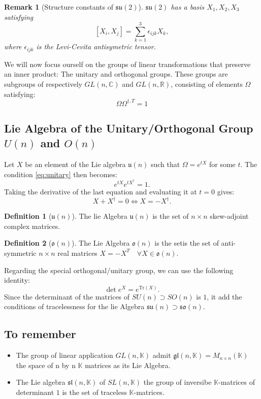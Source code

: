 \documentclass[11pt,a4paper]{article}
\newtheorem*{remark}{Remark}
\theoremstyle{definition}
\newtheorem{definition}{Definition}[section]
\numberwithin{equation}{section}
\begin{document}
\begin{remark}[Structure constants of $\mathfrak{su}(2)$]
    $\mathfrak{su}(2)$ has a basis $X_1,X_2,X_3$ satisfying
    \begin{equation*}
        \left[X_i,X_j\right] = \sum_{k=1}^{3}\epsilon_{ijk}X_k,
    \end{equation*}
    where $\epsilon_{ijk}$ is the Levi-Cevita antisymetric tensor.
\end{remark}
We will now focus ourself on the groups of linear transformations that preserve an inner product: The unitary and orthogonal groups. These groups are subgroups of respectively $GL(n,\mathbb{C})$ and $GL(n,\mathbb{R})$, consisting of elements $\Omega$ satisfying:
\begin{equation}
    \label{eq:unitary}
    \Omega\Omega^{\dagger,T} = 1
\end{equation}
\subsection{Lie Algebra of the Unitary/Orthogonal Group $U(n)$ and $ O(n)$}
Let $X$ be an element of the Lie algebra $\mathfrak{u}(n)$ such that $\Omega = e^{tX}$ for some $t$.
The condition \ref{eq:unitary} then becomes:
\begin{equation*}
    e^{tX}e^{tX^\dagger} = 1.
\end{equation*}
Taking the derivative of the last equation and evaluating it at $t=0$ gives:
\begin{equation*}
    X + X^\dagger = 0 \Leftrightarrow X = -X^\dagger.
\end{equation*}
\begin{definition}[$\mathfrak{u}(n)$]
    The lie Algebra $\mathfrak{u}(n)$ is the set of $n\times n$ skew-adjoint complex matrices.
\end{definition}

\begin{definition}[$\mathfrak{o}(n)$]
    The Lie Algebra $\mathfrak{o}(n)$ is the setis the set of  anti-symmetric $n\times n$ real matrices $X = - X^T \quad \forall X \in \mathfrak{o}(n)$.
\end{definition}
Regarding the special orthogonal/unitary group, we can use the following identity:
\begin{equation*}
    \det e^{X} = e^{\text{Tr}(X)}.
\end{equation*}
Since the determinant of the matrices of $SU(n)\supset SO(n)$ is $1$, it add the conditions of tracelessness for the lie Algebra  $\mathfrak{su}(n) \supset \mathfrak{so}(n)$.
\subsection{To remember}
\begin{itemize}
    \item The group of linear application $GL(n,\mathbb{K})$ admit $\mathfrak{gl}(n, \mathbb{K}) = M_{n\times n}(\mathbb{K})$ the space of n by n $\mathbb{K}$ matrices as its Lie Algebra.
    \item The Lie algebra $\mathfrak{sl}(n,\mathbb{K})$ of $SL(n,\mathbb{K})$ the group of inversibe  $\mathbb{K}$-matrices of determinant $1$ is the set of traceless $\mathbb{K}$-matrices.
\end{itemize}
\end{document}
